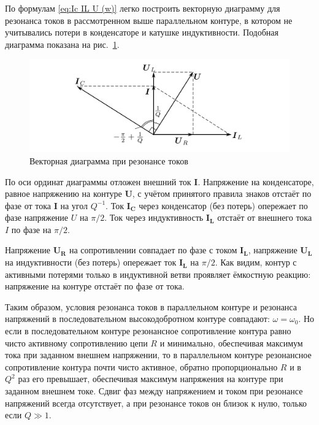 \documentclass[a4paper, 12pt]{article}
\begin{document}
По формулам \eqref{eq:Ic IL U (w)} легко построить векторную диаграмму для резонанса токов в рассмотренном выше параллельном контуре, в котором не учитывались потери в конденсаторе и катушке индуктивности. Подобная диаграмма показана на рис.~\ref{ris2}.

\begin{figure}[h!]
\begin{center}
    \includegraphics[scale=2]{2.png}
\end{center}
\caption{Векторная диаграмма при резонансе токов}
\label{ris2}
\end{figure}

По оси ординат диаграммы отложен внешний ток $\mathbf{I}$. Напряжение на конденсаторе, равное напряжению на контуре $\mathbf{U}$, с учётом принятого правила знаков отстаёт по фазе от тока $\mathbf{I}$ на угол $Q^{-1}$. Ток $\mathbf{I_C}$ через конденсатор (без потерь) опережает по фазе напряжение $U$ на $\pi/2$. Ток через индуктивность $\mathbf{I_L}$ отстаёт от внешнего тока $I$ по фазе на $\pi/2$.

Напряжение $\mathbf{U_R}$ на сопротивлении совпадает по фазе с током $\mathbf{I_L}$, напряжение $\mathbf{U_L}$ на индуктивности (без потерь) опережает ток $\mathbf{I_L}$ на $\pi/2$. Как видим, контур с активными потерями только в индуктивной ветви проявляет ёмкостную реакцию: напряжение на контуре отстаёт по фазе от тока.

Таким образом, условия резонанса токов в параллельном контуре и резонанса напряжений в последовательном высокодобротном контуре совпадают: $\omega = \omega_0$. Но если в последовательном контуре резонансное сопротивление контура равно чисто активному сопротивлению цепи $R$ и минимально, обеспечивая максимум тока при заданном внешнем напряжении, то в параллельном контуре резонансное сопротивление контура почти чисто активное, обратно пропорционально $R$ и в $Q^2$ раз его превышает, обеспечивая максимум напряжения на контуре при заданном внешнем токе. Сдвиг фаз между напряжением и током при резонансе напряжений всегда отсутствует, а при резонансе токов он близок к нулю, только если $Q \gg 1$.
\end{document}
